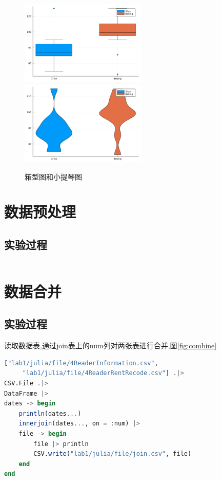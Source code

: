 \documentclass[a4paper]{article}
\begin{document}
\begin{figure}[h]
    \centering
    \includegraphics[width=6cm]{images/box.png}
    \includegraphics[width=6cm]{images/violin.png}
    \caption{箱型图和小提琴图}
    \label{fig:violin_box}
\end{figure}

\newpage

\section{数据预处理}\label{sub:pre_process}
\subsection{实验过程} \label{sub:pre_process-lab}

\begin{lstlisting}[language=julia]
\end{lstlisting}

\newpage

\section{数据合并}\label{sub:data_join}
\subsection{实验过程} \label{sub:data_join-lab}

读取数据表,通过join表上的num列对两张表进行合并,图\ref{fig:combine}

\begin{lstlisting}[language=julia]
["lab1/julia/file/4ReaderInformation.csv",
     "lab1/julia/file/4ReaderRentRecode.csv"] .|>
CSV.File .|>
DataFrame |>
dates -> begin
    println(dates...)
    innerjoin(dates..., on = :num) |>
    file -> begin
        file |> println
        CSV.write("lab1/julia/file/join.csv", file)
    end
end
\end{lstlisting}
\end{document}
